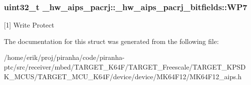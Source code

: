 \subsubsection[{\texorpdfstring{W\+P7}{WP7}}]{\setlength{\rightskip}{0pt plus 5cm}uint32\+\_\+t \+\_\+hw\+\_\+aips\+\_\+pacrj\+::\+\_\+hw\+\_\+aips\+\_\+pacrj\+\_\+bitfields\+::\+W\+P7}\hypertarget{struct__hw__aips__pacrj_1_1__hw__aips__pacrj__bitfields_a7b97dc427efa7001a90f9422a392eea6}{}\label{struct__hw__aips__pacrj_1_1__hw__aips__pacrj__bitfields_a7b97dc427efa7001a90f9422a392eea6}
\mbox{[}1\mbox{]} Write Protect 

The documentation for this struct was generated from the following file\+:\begin{DoxyCompactItemize}
\item 
/home/erik/proj/piranha/code/piranha-\/ptc/src/receiver/mbed/\+T\+A\+R\+G\+E\+T\+\_\+\+K64\+F/\+T\+A\+R\+G\+E\+T\+\_\+\+Freescale/\+T\+A\+R\+G\+E\+T\+\_\+\+K\+P\+S\+D\+K\+\_\+\+M\+C\+U\+S/\+T\+A\+R\+G\+E\+T\+\_\+\+M\+C\+U\+\_\+\+K64\+F/device/device/\+M\+K64\+F12/M\+K64\+F12\+\_\+aips.\+h\end{DoxyCompactItemize}
